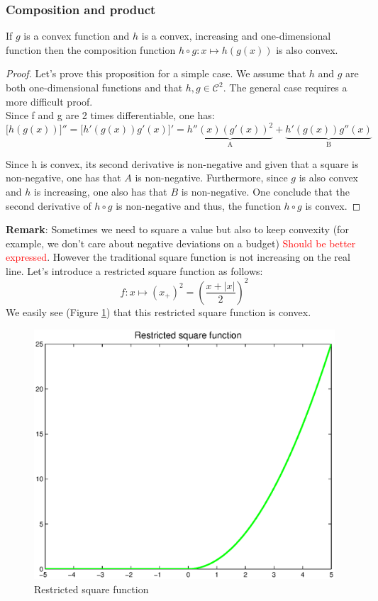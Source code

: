 \subsubsection{Composition and product}
\begin{property}
If $g$ is a convex function and $h$ is a convex, increasing and one-dimensional function then the composition function $h \circ g: x \mapsto h(g(x))$ is also convex. 
\end{property}
\begin{proof}
Let's prove this proposition for a simple case. We assume that $h$ and $g$ are both one-dimensional functions and that $h,g \in \mathcal{C}^2$. The general case requires a more difficult proof. \\
Since f and g are 2 times differentiable, one has:
$$\big[ h(g(x))\big]'' = \big[ h'(g(x))g'(x)\big]' = \underbrace{h''(x)(g'(x))^2}_\text{A} + \underbrace{h'(g(x))g''(x)}_\text{B} $$

Since h is convex, its second derivative is non-negative and given that a square is non-negative, one has that $A$ is non-negative. Furthermore, since $g$ is also convex and $h$ is increasing, one also has that $B$ is non-negative. One conclude that the second derivative of $h \circ g$ is non-negative and thus, the function $h \circ g$ is convex. 
\end{proof}
\textbf{Remark}: Sometimes we need to square a value but also to keep convexity (for example, we don't care about negative deviations on a budget) \textcolor{red}{Should be better expressed}. However the traditional square function is not increasing on the real line. Let's introduce a restricted square function as follows: 
$$f: x \mapsto (x_+)^2 = (\frac{x + |x|}{2})^2$$
We easily see (Figure \ref{restricted}) that this restricted square function is convex.

\begin{figure}[H]
\begin{center}
\includegraphics[scale=0.5]{./images/Course4_restrictedsquare.eps}
\caption{Restricted square function}
\label{restricted}
\end{center}
\end{figure}

